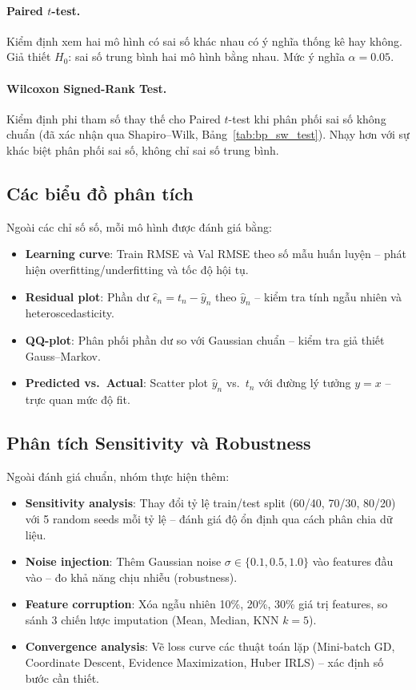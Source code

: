\documentclass[12pt,a4paper]{article}
\begin{document}
\paragraph{Paired $t$-test.}
Kiểm định xem hai mô hình có sai số khác nhau có ý nghĩa thống kê hay không.
Giả thiết $H_0$: sai số trung bình hai mô hình bằng nhau. Mức ý nghĩa
$\alpha = 0.05$.

\paragraph{Wilcoxon Signed-Rank Test.}
Kiểm định phi tham số thay thế cho Paired $t$-test khi phân phối sai số
không chuẩn (đã xác nhận qua Shapiro--Wilk, Bảng~\ref{tab:bp_sw_test}).
Nhạy hơn với sự khác biệt phân phối sai số, không chỉ sai số trung bình.

\subsection{Các biểu đồ phân tích}

Ngoài các chỉ số số, mỗi mô hình được đánh giá bằng:

\begin{itemize}
  \item \textbf{Learning curve}: Train RMSE và Val RMSE theo số mẫu huấn
        luyện -- phát hiện overfitting/underfitting và tốc độ hội tụ.
  \item \textbf{Residual plot}: Phần dư $\hat{\epsilon}_n = t_n - \hat{y}_n$
        theo $\hat{y}_n$ -- kiểm tra tính ngẫu nhiên và heteroscedasticity.
  \item \textbf{QQ-plot}: Phân phối phần dư so với Gaussian chuẩn --
        kiểm tra giả thiết Gauss--Markov.
  \item \textbf{Predicted vs.\ Actual}: Scatter plot $\hat{y}_n$ vs.\ $t_n$
        với đường lý tưởng $y = x$ -- trực quan mức độ fit.
\end{itemize}

\subsection{Phân tích Sensitivity và Robustness}

Ngoài đánh giá chuẩn, nhóm thực hiện thêm:

\begin{itemize}
  \item \textbf{Sensitivity analysis}: Thay đổi tỷ lệ train/test split
        (60/40, 70/30, 80/20) với 5 random seeds mỗi tỷ lệ -- đánh giá
        độ ổn định qua cách phân chia dữ liệu.
  \item \textbf{Noise injection}: Thêm Gaussian noise
        $\sigma \in \{0.1, 0.5, 1.0\}$ vào features đầu vào -- đo khả
        năng chịu nhiễu (robustness).
  \item \textbf{Feature corruption}: Xóa ngẫu nhiên 10\%, 20\%, 30\%
        giá trị features, so sánh 3 chiến lược imputation
        (Mean, Median, KNN $k=5$).
  \item \textbf{Convergence analysis}: Vẽ loss curve các thuật toán lặp
        (Mini-batch GD, Coordinate Descent, Evidence Maximization,
        Huber IRLS) -- xác định số bước cần thiết.
\end{itemize}
\end{document}
